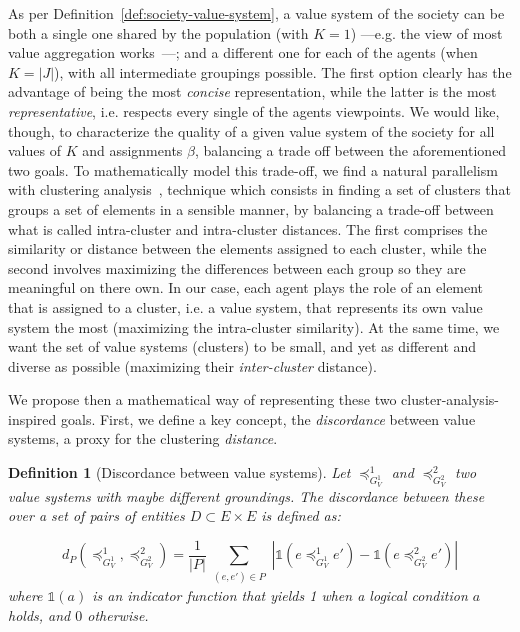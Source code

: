 \documentclass{ecai}
\newtheorem{definition}{Definition}
\newcommand{\abs}[1]{{\left|#1\right|}}
\begin{document}
As per Definition~\ref{def:society-value-system}, a value system of the society can be both a single one shared by the population (with $K=1$) ---e.g. the view of most value aggregation works~\cite{Liscio2023BlueskyTrackValueInference}---; and a different one for each of the agents (when $K=\abs{J}$), with all intermediate groupings possible. The first option clearly has the advantage of being the most \textit{concise} representation, while the latter is the most \textit{representative}, i.e. respects every single of the agents viewpoints. 
We would like, though, to characterize the quality of a given value system of the society for all values of $K$ and assignments $\beta$, balancing a trade off between the aforementioned two goals. To mathematically model this trade-off, we find a natural parallelism with clustering analysis~\cite{Kettenring2006clusteringinterintra}, technique which consists in finding a set of clusters that groups a set of elements in a sensible manner, by balancing a trade-off between what is called intra-cluster and intra-cluster distances. The first comprises the similarity or distance between the elements assigned to each cluster, while the second involves maximizing the differences between each group so they are meaningful on there own. 
In our case, each agent plays the role of an element that is assigned to a cluster, i.e. a value system, that represents its own value system the most (maximizing the intra-cluster similarity). At the same time, we want the set of value systems (clusters) to be small, and yet as different and diverse as possible (maximizing their \textit{inter-cluster} distance).

We propose then a mathematical way of representing these two cluster-analysis-inspired goals. First, we define a key concept, the \textit{discordance} between value systems, a proxy for the clustering \textit{distance}. 

\begin{definition}[Discordance between value systems]
    Let $\preccurlyeq_{G_V^1}^1$ and $\preccurlyeq_{G_V^2}^2$ two value systems with maybe different groundings. The discordance between these over a set of pairs of entities $D\subset E\times E$ is defined as:

$$d_{P}\left(\preccurlyeq^1_{G_V^1}, \preccurlyeq^2_{G_V^2}\right) = \frac{1}{\abs{P}}\sum_{\substack{(e,e')\in P}}\abs{\mathds{1}\left({e \preccurlyeq^1_{G_V^1} e'}\right)-\mathds{1}\left( e \preccurlyeq^2_{G_V^2} e'\right)}$$    
where $\mathds{1}(a)$ is an indicator function that yields 1 when a logical condition $a$ holds, and $0$ otherwise.
\end{definition}
\end{document}
